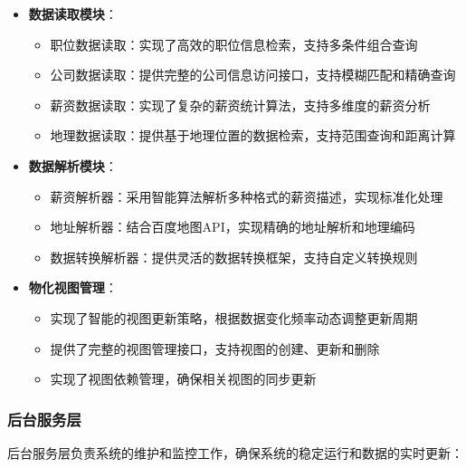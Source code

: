 \begin{itemize}
    \item \textbf{数据读取模块}：
    \begin{itemize}
        \item 职位数据读取：实现了高效的职位信息检索，支持多条件组合查询
        \item 公司数据读取：提供完整的公司信息访问接口，支持模糊匹配和精确查询
        \item 薪资数据读取：实现了复杂的薪资统计算法，支持多维度的薪资分析
        \item 地理数据读取：提供基于地理位置的数据检索，支持范围查询和距离计算
    \end{itemize}
    
    \item \textbf{数据解析模块}：
    \begin{itemize}
        \item 薪资解析器：采用智能算法解析多种格式的薪资描述，实现标准化处理
        \item 地址解析器：结合百度地图API，实现精确的地址解析和地理编码
        \item 数据转换解析器：提供灵活的数据转换框架，支持自定义转换规则
    \end{itemize}
    
    \item \textbf{物化视图管理}：
    \begin{itemize}
        \item 实现了智能的视图更新策略，根据数据变化频率动态调整更新周期
        \item 提供了完整的视图管理接口，支持视图的创建、更新和删除
        \item 实现了视图依赖管理，确保相关视图的同步更新
    \end{itemize}
\end{itemize}
\subsubsection{后台服务层}
后台服务层负责系统的维护和监控工作，确保系统的稳定运行和数据的实时更新：

